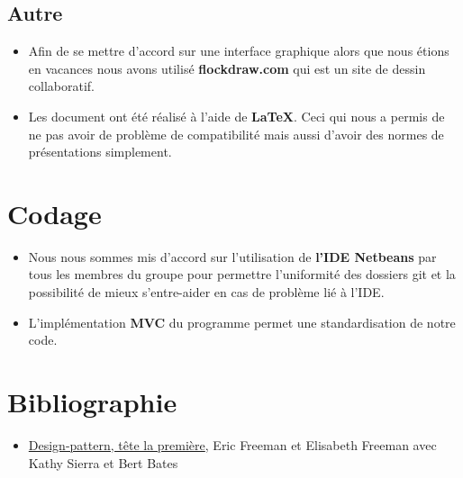 \documentclass[12pt,a4paper]{article}
\begin{document}
\subsection*{Autre}
\begin{itemize}
\item Afin de se mettre d'accord sur une interface graphique alors que nous étions en vacances nous avons utilisé \textbf{flockdraw.com} qui est un site de dessin collaboratif.
\item Les document ont été réalisé à l'aide de \textbf{LaTeX}. Ceci qui nous a permis de ne pas avoir de problème de compatibilité mais aussi d'avoir des normes de présentations simplement.
\end{itemize}

\section*{Codage}
\begin{itemize}
\item Nous nous sommes mis d'accord sur l'utilisation de \textbf{l'IDE Netbeans} par tous les membres du groupe pour permettre l'uniformité des dossiers git et la possibilité de mieux s'entre-aider en cas de problème lié à l'IDE.
\item L'implémentation \textbf{MVC} du programme permet une standardisation de notre code.
\end{itemize}


\section*{Bibliographie}
\begin{itemize}
\item \underline{Design-pattern, tête la première}, Eric Freeman et Elisabeth Freeman
avec Kathy Sierra et Bert Bates
\end{itemize}
\end{document}
